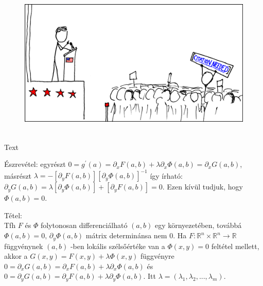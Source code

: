 \documentclass[12pt,a4paper]{scrartcl}
\newenvironment{tetel}{}{}
\newenvironment{ajanlofig}{\begin{figure}\begin{center}}{
\end{center}\end{figure}}
\begin{document}
\begin{ajanlo}

\begin{ajanlofig}

\href{https://xkcd.com}{\includegraphics[width=5.20833in,height=2.82292in]{wikipedian_protester.png}}

\end{ajanlofig}

Text

\end{ajanlo}

Észrevétel: egyrészt
\(0 = g^{\prime}\left( a \right) = \partial_{x}F\left( {a,b} \right) + \lambda\partial_{x}\Phi\left( {a,b} \right) = \partial_{x}G\left( {a,b} \right)\),
másrészt
\(\lambda = - \left\lbrack {\partial_{y}F\left( {a,b} \right)} \right\rbrack\left\lbrack {\partial_{y}\Phi\left( {a,b} \right)} \right\rbrack^{- 1}\)
így írható:
\(\partial_{y}G\left( {a,b} \right) = \lambda\left\lbrack {\partial_{y}\Phi\left( {a,b} \right)} \right\rbrack + \left\lbrack {\partial_{y}F\left( {a,b} \right)} \right\rbrack = 0\).
Ezen kívül tudjuk, hogy \(\Phi\left( {a,b} \right) = 0\).

\begin{tetel}

Tétel:\\
Tfh \(F\) és \(\Phi\) folytonosan differenciálható
\(\left( {a,b} \right)\) egy környezetében, továbbá
\(\Phi\left( {a,b} \right) = 0,\,\partial_{y}\Phi\left( {a,b} \right)\)
mátrix determinánsa nem 0. Ha
\(\left. F:{\mathbb{R}}^{n} \times {\mathbb{R}}^{n}\rightarrow{\mathbb{R}} \right.\)
függvénynek \(\left( {a,b} \right)\) -ben lokális szélsőértéke van a
\(\Phi\left( {x,y} \right) = 0\) feltétel mellett, akkor a
\(G\left( {x,y} \right) = F\left( {x,y} \right) + \lambda\Phi\left( {x,y} \right)\)
függvényre
\(0 = \partial_{x}G\left( {a,b} \right) = \partial_{x}F\left( {a,b} \right) + \lambda\partial_{x}\Phi\left( {a,b} \right)\)
és
\(0 = \partial_{y}G\left( {a,b} \right) = \partial_{y}F\left( {a,b} \right) + \lambda\partial_{y}\Phi\left( {a,b} \right)\).
Itt
\(\lambda = \left( {\lambda_{1},\lambda_{2},...,\lambda_{m}} \right)\).

\end{tetel}
\end{document}
